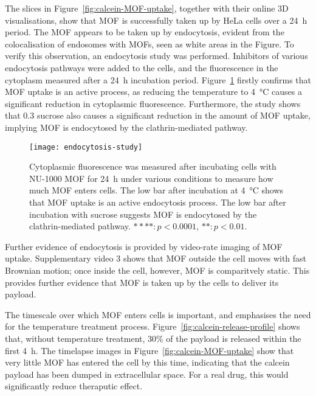 The slices in Figure~\ref{fig:calcein-MOF-uptake}, together with their online 3D visualisations, show that MOF is successfully taken up by HeLa cells over a \SI{24}{\hour} period. 
The MOF appears to be taken up by endocytosis, evident from the colocalisation of endosomes with MOFs, seen as white areas in the Figure. 
To verify this observation, an endocytosis study was performed.
Inhibitors of various endocytosis pathways were added to the cells, and the fluorescence in the cytoplasm measured after a \SI{24}{\hour} incubation period. 
Figure~\ref{fig:endocytosis-study} firstly confirms that MOF uptake is an active process, as reducing the temperature to \SI{4}{\degreeCelsius} causes a significant reduction in cytoplasmic fluorescence. 
Furthermore, the study shows that \SI{0.3}{\Molar} sucrose also causes a significant reduction in the amount of MOF uptake, implying MOF is endocytosed by the clathrin-mediated pathway. 

\begin{figure}[htbp!]
\centering
\texttt{[image: endocytosis-study]}
\caption[MOFs: An endocytosis study shows NU-1000 MOF is taken up by HeLa cells through the clathrin-mediated pathway]{Cytoplasmic fluorescence was measured after incubating cells with NU-1000 MOF for \SI{24}{\hour} under various conditions to measure how much MOF enters cells. The low bar after incubation at \SI{4}{\degreeCelsius} shows that MOF uptake is an active endocytosis process. The low bar after incubation with sucrose suggests MOF is endocytosed by the clathrin-mediated pathway. $****: p<0.0001$, $**: p<0.01$. }
\label{fig:endocytosis-study}
\end{figure}

Further evidence of endocytosis is provided by video-rate imaging of MOF uptake.
Supplementary video 3 shows that MOF outside the cell moves with fast Brownian motion; once inside the cell, however, MOF is comparitvely static. 
This provides further evidence that MOF is taken up by the cells to deliver its payload. 

The timescale over which MOF enters cells is important, and emphasises the need for the temperature treatment process. 
Figure~\ref{fig:calcein-release-profile} shows that, without temperature treatment, 30\% of the payload is released within the first \SI{4}{\hour}. 
The timelapse images in Figure~\ref{fig:calcein-MOF-uptake} show that very little MOF has entered the cell by this time, indicating that the calcein payload has been dumped in extracellular space. 
For a real drug, this would significantly reduce theraputic effect. %


